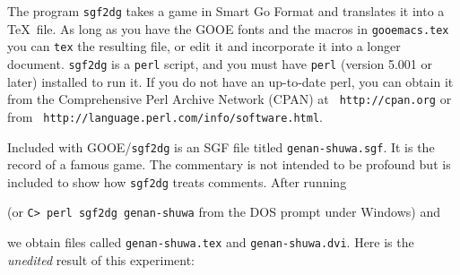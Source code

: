 The program {\tt sgf2dg} takes a game in Smart Go Format and
translates it into a \TeX\ file. As long as you have the GOOE
fonts and the macros in {\tt gooemacs.tex} you can {\tt tex} the
resulting file, or edit it and incorporate it into a longer
document. {\tt sgf2dg} is a {\tt perl} script, and you must have
{\tt perl} (version 5.001 or later) installed to run it.  If you
do not have an up-to-date perl, you can obtain it from the
Comprehensive Perl Archive Network (CPAN) at {\tt
http://cpan.org} or from {\tt
http://language.perl.com/info/software.html}.

Included with GOOE/{\tt sgf2dg} is an SGF file titled
{\tt genan-shuwa.sgf}. It is the record of a famous game. The commentary
is not intended to be profound but is included to show how {\tt sgf2dg}
treats comments. After running 

\medbreak
{}
\medbreak\noindent
(or {\tt C> perl sgf2dg genan-shuwa} from the DOS prompt under Windows)
and

\medbreak
{}

\medbreak\noindent
we obtain files called {\tt genan-shuwa.tex} and {\tt genan-shuwa.dvi}. Here
is the {\it unedited} result of this experiment:

